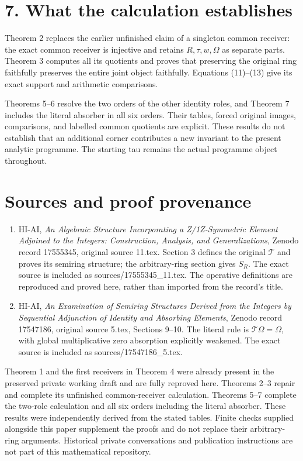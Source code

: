 \documentclass[
]{article}
\providecommand{\tightlist}{%
  \setlength{\itemsep}{0pt}\setlength{\parskip}{0pt}}
\begin{document}
\section{7. What the calculation
establishes}\label{what-the-calculation-establishes}

Theorem 2 replaces the earlier unfinished claim of a singleton common
receiver: the exact common receiver is injective and retains
\(R,\tau,w,\Omega\) as separate parts. Theorem 3 computes all its
quotients and proves that preserving the original ring faithfully
preserves the entire joint object faithfully. Equations (11)--(13) give
its exact support and arithmetic comparisons.

Theorems 5--6 resolve the two orders of the other identity roles, and
Theorem 7 includes the literal absorber in all six orders. Their tables,
forced original images, comparisons, and labelled common quotients are
explicit. These results do not establish that an additional corner
contributes a new invariant to the present analytic programme. The
starting tau remains the actual programme object throughout.

\section{Sources and proof
provenance}\label{sources-and-proof-provenance}

\begin{enumerate}
\def\labelenumi{\arabic{enumi}.}
\tightlist
\item
  HI-AI, \emph{An Algebraic Structure Incorporating a Z/1Z-Symmetric
  Element Adjoined to the Integers: Construction, Analysis, and
  Generalizations}, Zenodo record 17555345, original source 11.tex.
  Section 3 defines the original \(\mathcal T\) and proves its semiring
  structure; the arbitrary-ring section gives \(S_R\). The exact source
  is included as sources/17555345\_11.tex. The operative definitions are
  reproduced and proved here, rather than imported from the record's
  title.
\item
  HI-AI, \emph{An Examination of Semiring Structures Derived from the
  Integers by Sequential Adjunction of Identity and Absorbing Elements},
  Zenodo record 17547186, original source 5.tex, Sections 9--10. The
  literal rule is \(\mathcal T\Omega=\Omega\), with global
  multiplicative zero absorption explicitly weakened. The exact source
  is included as sources/17547186\_5.tex.
\end{enumerate}

Theorem 1 and the first receivers in Theorem 4 were already present in
the preserved private working draft and are fully reproved here.
Theorems 2--3 repair and complete its unfinished common-receiver
calculation. Theorems 5--7 complete the two-role calculation and all six
orders including the literal absorber. These results were independently
derived from the stated tables. Finite checks supplied alongside this
paper supplement the proofs and do not replace their arbitrary-ring
arguments. Historical private conversations and publication instructions
are not part of this mathematical repository.
\end{document}
